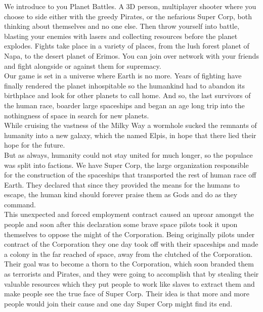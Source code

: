 


\begin{abstracts}        %

We introduce to you Planet Battles. A 3D person, multiplayer shooter where you choose to side either with the greedy Pirates, or the nefarious Super Corp, both thinking about themselves and no one else. Then throw yourself into battle, blasting your enemies with lasers and collecting resources before the planet explodes. Fights take place in a variety of places, from the lush forest planet of Napa, to the desert planet of Erimos. You can join over network with your friends and fight alongside or against them for supremacy.\\

Our game is set in a universe where Earth is no more. Years of fighting have finally rendered the planet inhospitable so the humankind had to abandon its birthplace and look for other planets to call home. And so, the last survivors of the human race, boarder large spaceships and began an age long trip into the nothingness of space in search for new planets.\\

While cruising the vastness of the Milky Way a wormhole sucked the remnants of humanity into a new galaxy, which the named Elpis, in hope that there lied their hope for the future.\\

But as always, humanity could not stay united for much longer, so the populace was split into factions. We have Super Corp, the large organization responsible for the construction of the spaceships that transported the rest of human race off Earth. They declared that since they provided the means for the humans to escape, the human kind should forever praise them as Gods and do as they command.\\

This unexpected and forced employment contract caused an uproar amongst the people and soon after this declaration some brave space pilots took it upon themselves to oppose the might of the Corporation. Being originally pilots under contract of the Corporation they one day took off with their spaceships and made a colony in the far reached of space, away from the clutched of the Corporation.\\

Their goal was to become a thorn to the Corporation, which soon branded them as terrorists and Pirates, and they were going to accomplish that by stealing their valuable resources which they put people to work like slaves to extract them and make people see the true face of Super Corp. Their idea is that more and more people would join their cause and one day Super Corp might find its end.\\

\end{abstracts}




